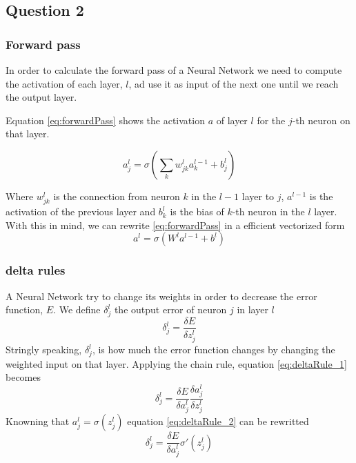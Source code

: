 \documentclass[11pt]{article}
\begin{document}
\subsection{Question 2}
\subsubsection{Forward pass}
In order to calculate the forward pass of a Neural Network we need to compute the activation of each layer, $l$, ad use it as input of the next one until we reach the output layer.

Equation \ref{eq:forwardPass} shows the activation $a$ of layer $l$ for the $j$-th neuron on that layer.

\begin{equation}
\label{eq:forwardPass}
a^l_j = \sigma(\sum_k w^l_{jk}a^{l-1}_k + b^l_j)
\end{equation}

Where $w^l_{jk}$ is the connection from neuron $k$ in the $l-1$ layer to $j$, $a^{l-1}$ is the activation of the previous layer and $b^l_k$ is the bias of $k$-th neuron in the $l$ layer. With this in mind, we can rewrite \ref{eq:forwardPass} in a efficient vectorized form
\begin{equation}
\label{eq:forwardPassVectorized}
a^l = \sigma(W^la^{l-1} + b^l)
\end{equation}

\subsubsection{delta rules}
A Neural Network try to change its weights in order to decrease the error function, $E$. We define $\delta^l_j$ the output error of neuron $j$ in layer $l$
\begin{equation}
	\label{eq:deltaRule_1}
	\delta^l_j = \frac{\delta E}{\delta z^l_j}
\end{equation}
Stringly speaking, $\delta^l_j$, is how much the error function changes by changing the weighted input on that layer. Applying the chain rule, equation \ref{eq:deltaRule_1} becomes
\begin{equation}
\label{eq:deltaRule_2}
\delta^l_j = \frac{\delta E}{\delta a^l_j} \frac{\delta a^l_j}{\delta z^l_j}
\end{equation}
Knowning that $a^l_j = \sigma(z^l_j)$ equation \ref{eq:deltaRule_2} can be rewritted
\begin{equation}
\label{eq:deltaRule}	
\delta^l_j = \frac{\delta E}{\delta a^l_j} \sigma'(z^l_j)
\end{equation}  
\end{document}
